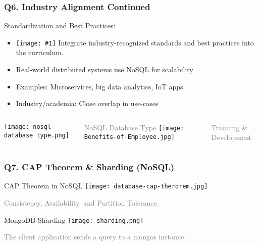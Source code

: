 \documentclass{beamer}
\newcommand{\icon}[1]{\texttt{[image: \#1]}}
\begin{document}
\begin{frame}[t]
\frametitle{Q6. Industry Alignment Continued}
\vspace{-0.2cm}
\begin{block}{Standardization and Best Practices:}
    \begin{itemize}
        \item\icon{check-mark.png} Integrate industry-recognized standards and best practices into the curriculum.
    \end{itemize}
\end{block}
\vspace{0.1cm}
\begin{itemize}
    \item Real-world distributed systems use NoSQL for scalability
    \item Examples: Microservices, big data analytics, IoT apps
    \item Industry/academia: Close overlap in use-cases
\end{itemize}

\begin{columns}
    \texttt{[image: nosql database type.png]}
    \par\scriptsize\textcolor{gray}{NoSQL Database Type}
    \texttt{[image: Benefits-of-Employee.jpg]}
    \par\scriptsize\textcolor{gray}{Tranning \& Development}
\end{columns}
\end{frame}

\begin{frame}[t]
\frametitle{Q7. CAP Theorem \& Sharding (NoSQL)}
\vspace{-0.4cm}
\begin{block}{CAP Theorem in NoSQL}
    \centering
    \texttt{[image: database-cap-therorem.jpg]}
    \par\scriptsize\textcolor{gray}{Consistency, Availability, and Partition Tolerance.}
\end{block}
\vspace{-0.1cm}
\begin{block}{MongoDB Sharding}
    \centering
    \texttt{[image: sharding.png]}
    \par\scriptsize\textcolor{gray}{The client application sends a query to a mongos instance.}
\end{block}
\end{frame}
\end{document}
